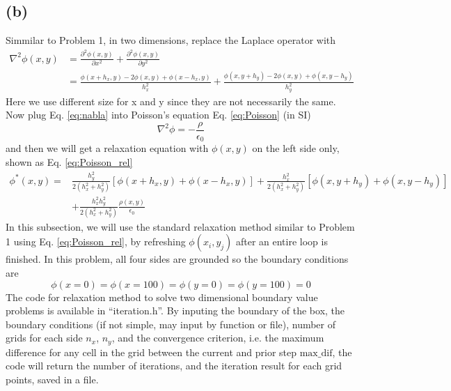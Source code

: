 \documentclass[12pt, graphicx]{article}
\begin{document}
\subsection*{(b)}
Simmilar to Problem 1, in two dimensions, replace the Laplace operator with 
\begin{equation}
\begin{aligned}
\nabla^2\phi(x,y)&=\frac{\partial^2\phi(x,y)}{\partial x^2}+\frac{\partial^2\phi(x,y)}{\partial y^2}\\&=\frac{\phi(x+h_x,y)-2\phi(x,y)+\phi(x-h_x,y)}{h_x^2}+\frac{\phi(x,y+h_y)-2\phi(x,y)+\phi(x,y-h_y)}{h_y^2}
\end{aligned}
\label{eq:nabla}
\end{equation}
Here we use different size for x and y since they are not necessarily the same. Now plug Eq. \ref{eq:nabla} into Poisson's equation Eq. \ref{eq:Poisson} (in SI)
\begin{equation}
\nabla^2\phi=-\frac{\rho}{\epsilon_0}
\label{eq:Poisson}
\end{equation}
and then we will get a relaxation equation with $\phi(x,y)$ on the left side only, shown as Eq. \ref{eq:Poisson_rel} 
\begin{equation}
\begin{aligned}
\phi^*(x,y)=&\frac{h_y^2}{2(h_x^2+h_y^2)}[\phi(x+h_x,y)+\phi(x-h_x,y)]+\frac{h_x^2}{2(h_x^2+h_y^2)}[\phi(x,y+h_y)+\phi(x,y-h_y)]\\
&+\frac{h_x^2h_y^2}{2(h_x^2+h_y^2)}\frac{\rho(x,y)}{\epsilon_0}
\end{aligned}
\label{eq:Poisson_rel}
\end{equation}
In this subsection, we will use the standard relaxation method similar to Problem 1 using Eq. \ref{eq:Poisson_rel}, by refreshing $\phi(x_i,y_j)$ after an entire loop is finished. In this problem, all four sides are grounded so the boundary conditions are 
\begin{equation}
\phi(x=0)=\phi(x=100)=\phi(y=0)=\phi(y=100)=0
\label{eq:BC}
\end{equation}
The code for relaxation method to solve two dimensional boundary value problems is available in \textquotedblleft iteration.h\textquotedblright. By inputing the boundary of the box, the boundary conditions (if not simple, may input by function or file), number of grids for each side $n_x$, $n_y$, and the convergence criterion, i.e. the maximum difference for any cell in the grid between the current and prior step $\mathrm{max\_dif}$, the code will return the number of iterations, and the iteration result for each grid points, saved in a file. \par
\end{document}
